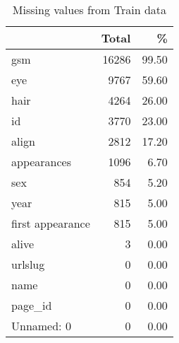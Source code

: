 \begin{table}
\centering
\caption{Missing values from Train data}
\label{tab:missingvals}
\begin{tabular}{lrr}
\toprule
{} &  Total &     \% \\
\midrule
gsm              &  16286 & 99.50 \\
eye              &   9767 & 59.60 \\
hair             &   4264 & 26.00 \\
id               &   3770 & 23.00 \\
align            &   2812 & 17.20 \\
appearances      &   1096 &  6.70 \\
sex              &    854 &  5.20 \\
year             &    815 &  5.00 \\
first appearance &    815 &  5.00 \\
alive            &      3 &  0.00 \\
urlslug          &      0 &  0.00 \\
name             &      0 &  0.00 \\
page\_id          &      0 &  0.00 \\
Unnamed: 0       &      0 &  0.00 \\
\bottomrule
\end{tabular}
\end{table}
